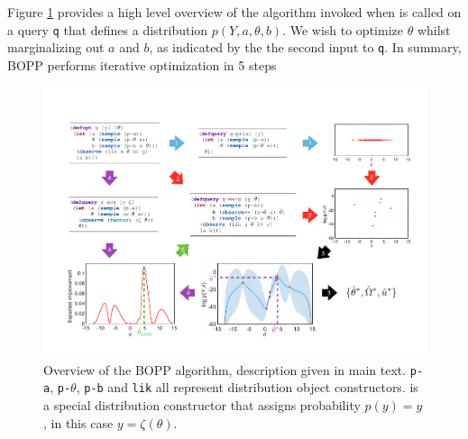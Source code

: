 Figure \ref{fig:bopp_overview} provides a high level overview of the algorithm invoked when \doopt is called on a query \texttt{q} that defines a distribution $p\left(Y, a, \theta , b\right)$.  We wish to optimize $\theta$ whilst marginalizing out $a$ and $b$, as indicated by the the second input to \texttt{q}. In summary, BOPP performs iterative optimization in 5 steps

\begin{figure}[t]
	\centering
	\includegraphics[width=\textwidth]{"bopp_overview_figure"}
	\caption{
		\label{fig:bopp_overview}
		Overview of the BOPP algorithm, description given in main text. \texttt{p-a}, \texttt{p-$\theta$}, \texttt{p-b} and \texttt{lik} all represent distribution object constructors. \boppfactor is a special distribution constructor that assigns probability $p(y) = y$, in this case $y = \zeta(\theta)$.}
\end{figure}


